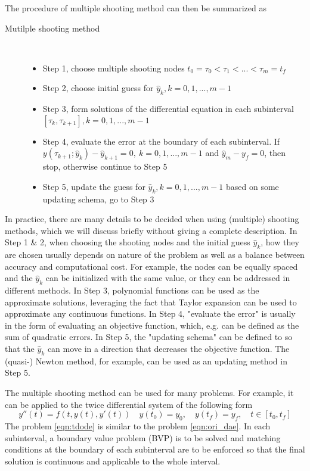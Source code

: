 \documentclass  [
  paper    = a4,
  BCOR     = 10mm,
  twoside,
  fontsize = 12pt,
  fleqn,
  toc      = bibnumbered,
  toc      = listofnumbered,
  numbers  = noendperiod,
  headings = normal,
  listof   = leveldown,
  version  = 3.03
]                                       {scrreprt}
\newcommand{\<}{\langle}
\renewcommand{\>}{\rangle}
\begin{document}
   The procedure of multiple shooting method can then be summarized as
   \begin{description}
   	\item[Mutilple shooting method] \
   	\begin{itemize}
   		\item Step 1, choose multiple shooting nodes $t_0 = \tau_0 < \tau_1 < ... < \tau_m = t_f$ 
   		\item Step 2, choose initial guess for $\hat{y}_k, k = 0, 1, ..., m-1$ 
   		\item Step 3, form solutions of the differential equation in each subinterval $[\tau_k, \tau_{k+1}], k = 0, 1, ..., m-1$
   		\item Step 4, evaluate the error at the boundary of each subinterval. If $y(\tau_{k+1}; \hat{y}_k) - \hat{y}_{k+1} = 0, \  k = 0, 1, ..., m-1$ and $\hat{y}_{m} - y_f =0$, then stop, otherwise continue to Step 5
   		\item Step 5, update the guess for $\hat{y}_k, k = 0, 1, ..., m-1$ based on some updating schema, go to Step 3
   	\end{itemize}
   \end{description}
   
   In practice, there are many details to be decided when using (multiple) shooting methods, which we will discuss briefly without giving a complete description. In Step 1 \& 2, when choosing the shooting nodes and the initial guess $\hat{y}_k$, how they are chosen usually depends on nature of the problem as well as a balance between accuracy and computational cost. For example, the nodes can be equally spaced and the $\hat{y}_k$ can be initialized with the same value, or they can be addressed in different methods. In Step 3, polynomial functions can be used as the approximate solutions, leveraging the fact that Taylor expansion can be used to approximate any continuous functions. In Step 4, "evaluate the error" is usually in the form of evaluating an objective function, which, e.g. can be defined as the sum of quadratic errors. In Step 5, the "updating schema" can be defined to so that the $\hat{y}_k$ can move in a direction that decreases the objective function. The (quasi-) Newton method, for example, can be used as an updating method in Step 5. 
   
   
   The multiple shooting method can be used for many problems. For example, it can be applied to the twice differential system of the following form 
   \begin{equation}
   y''(t) = f(t, y(t), y'(t))  \quad y(t_0) = y_0, \quad y(t_f) = y_f,  \quad t \in [t_0, t_f]
   \label{eqn:tdode}
   \end{equation}
   The problem \ref{eqn:tdode} is similar to the problem \ref{eqn:ori_dae}. In each subinterval, a boundary value problem (BVP) is to be solved and matching conditions at the boundary of each subinterval are to be enforced so that the final solution is continuous and applicable to the whole interval. 
   
\end{document}
